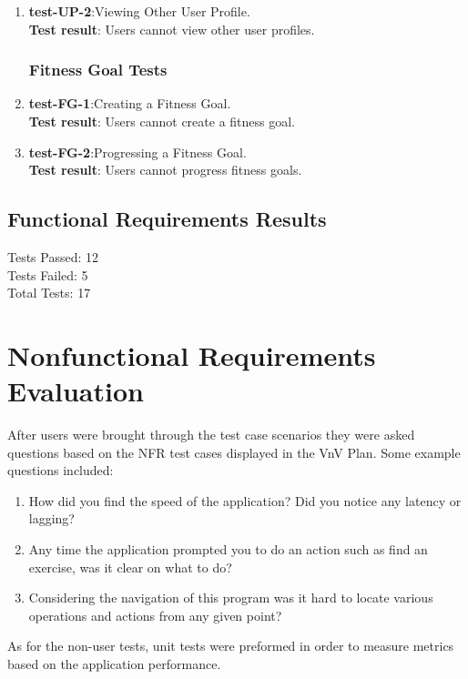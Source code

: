 \documentclass[12pt, titlepage]{article}
\begin{document}
\begin{enumerate}
    \item{\textbf{test-UP-2}}:Viewing Other User Profile.\\
    \textbf{Test result}: Users cannot view other user profiles.
   
\subsubsection{Fitness Goal Tests}
    \item{\textbf{test-FG-1}}:Creating a Fitness Goal.\\
    \textbf{Test result}: Users cannot create a fitness goal.
   
    \item{\textbf{test-FG-2}}:Progressing a Fitness Goal.\\
    \textbf{Test result}: Users cannot progress fitness goals.
      
\end{enumerate}

\subsection{Functional Requirements Results}

Tests Passed: 12\\
Tests Failed: 5\\
Total Tests: 17\\

\section{Nonfunctional Requirements Evaluation}

\noindent After users were brought through the test case scenarios they were asked questions based on the NFR test cases displayed in the VnV Plan.
Some example questions included: \\
\begin{enumerate}
	\item How did you find the speed of the application? Did you notice any latency or lagging?
	\item Any time the application prompted you to do an action such as find an exercise, was it clear on what to do?
	\item Considering the navigation of this program was it hard to locate various operations and actions from any given point?
\end{enumerate}

\noindent As for the non-user tests, unit tests were preformed in order to measure metrics based on the application performance.
\end{document}
